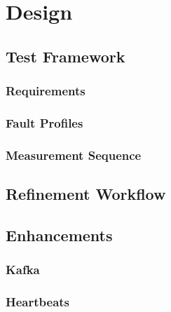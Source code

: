 \chapter{Design}

\section{Test Framework}

\subsection{Requirements}

\subsection{Fault Profiles}

\subsection{Measurement Sequence}

\section{Refinement Workflow}

\section{Enhancements}

\subsection{Kafka}

\subsection{Heartbeats}
